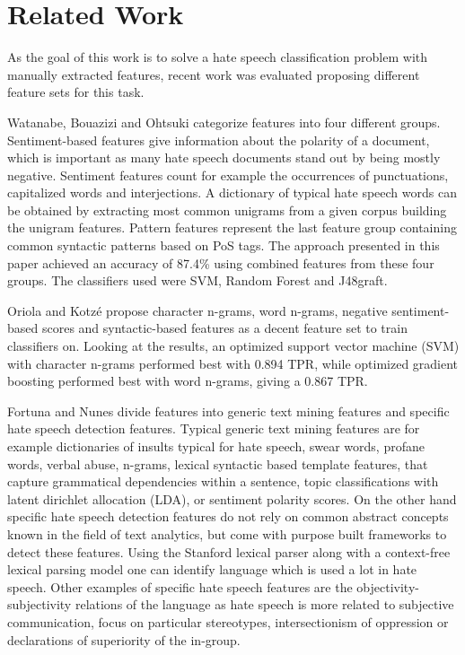 \section{Related Work} \label{related_work}

As the goal of this work is to solve a hate speech classification problem with manually extracted features, recent work was evaluated proposing different feature sets for this task. 

Watanabe, Bouazizi and Ohtsuki \cite{Watanabe2018} categorize features into four different groups. Sentiment-based fea\-tures give information about the polarity of a document, which is important as many hate speech documents stand out by being mostly negative. Sentiment features count for example the occurrences of punctuations, capitalized words and interjections. A dictionary of typical hate speech words can be obtained by extracting most common unigrams from a given corpus building the unigram features. Pattern features represent the last feature group containing common syntactic patterns based on PoS tags. The approach presented in this paper achieved an accuracy of 87.4\% using combined features from these four groups. The classifiers used were SVM, Random Forest and J48graft.

Oriola and Kotz\'{e} \cite{Oriola.2020} propose character n-grams, word n-grams, negative sentiment-based scores and syntactic-based features as a decent feature set to train classifiers on. Looking at the results, an optimized support vector machine (SVM) with character n-grams performed best with 0.894 TPR, while optimized gradient boosting performed best with word n-grams, giving a 0.867 TPR. 

Fortuna and Nunes \cite{Fortuna2018} divide features into generic text mining features and specific hate speech detection features. Typical generic text mining features are for example dictionaries of insults typical for hate speech, swear words, profane words, verbal abuse, n-grams, lexical syntactic based template features, that capture gram\-mat\-i\-cal dependencies within a sentence, topic classifications with latent dirich\-let allocation (LDA), or sentiment polarity scores. On the other hand specific hate speech detection features do not rely on common abstract concepts known in the field of text analytics, but come with purpose built frameworks to detect these features. Using the Stanford lexical parser along with a context-free lexical parsing model one can identify language which is used a lot in hate speech. Other examples of specific hate speech features are the objectivity-subjectivity relations of the language as hate speech is more related to subjective communication, focus on particular stereotypes, in\-ter\-sec\-tion\-ism of oppression or declarations of superiority of the in-group. 

